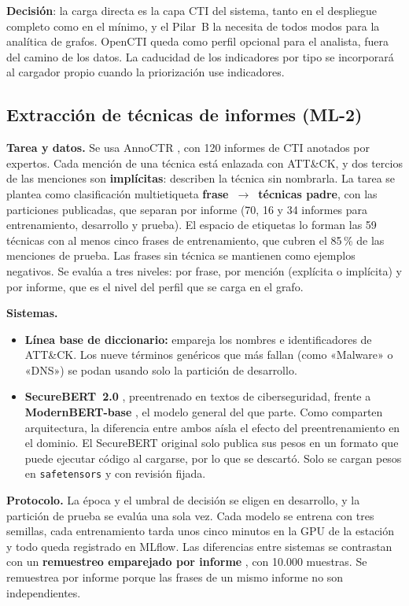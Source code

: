 \textbf{Decisión}: la carga directa es la capa CTI del sistema, tanto en el despliegue completo como
en el mínimo, y el Pilar~B la necesita de todos modos para la analítica de grafos. OpenCTI queda
como perfil opcional para el analista, fuera del camino de los datos. La caducidad de los
indicadores por tipo se incorporará al cargador propio cuando la priorización use indicadores.

\subsection{Extracción de técnicas de informes (ML-2)}
\label{sec:ml2}

\medskip\noindent\textbf{Tarea y datos.} Se usa AnnoCTR \cite{annoctr}, con 120 informes de CTI anotados por
expertos. Cada mención de una técnica está enlazada con ATT\&CK, y dos tercios de las menciones son
\textbf{implícitas}: describen la técnica sin nombrarla. La tarea se plantea como clasificación
multietiqueta \textbf{frase~$\rightarrow$~técnicas padre}, con las particiones publicadas, que
separan por informe (70, 16 y 34 informes para entrenamiento, desarrollo y prueba). El espacio
de etiquetas lo forman las 59 técnicas con al menos cinco frases de entrenamiento, que cubren el
85\,\% de las menciones de prueba. Las frases sin técnica se mantienen como ejemplos negativos.
Se evalúa a tres niveles: por frase, por mención (explícita o implícita) y por informe, que es
el nivel del perfil que se carga en el grafo.

\medskip\noindent\textbf{Sistemas.}
\begin{itemize}
    \item \textbf{Línea base de diccionario:} empareja los nombres e identificadores de ATT\&CK. Los
    nueve términos genéricos que más fallan (como «Malware» o «DNS») se podan usando solo la
    partición de desarrollo.
    \item \textbf{SecureBERT~2.0} \cite{securebert2}, preentrenado en textos de ciberseguridad, frente
    a \textbf{ModernBERT-base} \cite{modernbert}, el modelo general del que parte. Como comparten
    arquitectura, la diferencia entre ambos aísla el efecto del preentrenamiento en el dominio. El
    SecureBERT original solo publica sus pesos en un formato que puede ejecutar código al
    cargarse, por lo que se descartó. Solo se cargan pesos en \texttt{safetensors} y con revisión
    fijada.
\end{itemize}

\medskip\noindent\textbf{Protocolo.} La época y el umbral de decisión se eligen en desarrollo, y la partición
de prueba se evalúa una sola vez. Cada modelo se entrena con tres semillas, cada entrenamiento
tarda unos cinco minutos en la GPU de la estación y todo queda registrado en MLflow. Las
diferencias entre sistemas se contrastan con un \textbf{remuestreo emparejado por informe}
\cite{efron1993,bergkirkpatrick2012}, con 10.000 muestras. Se remuestrea por informe porque las
frases de un mismo informe no son independientes.

